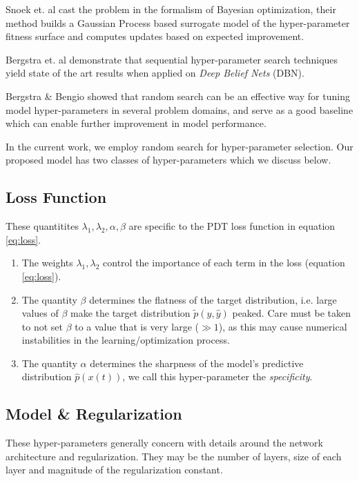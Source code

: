 \documentclass[envcountsect,runningheads]{llncs}
\theoremstyle{etoile}
\begin{document}
Snoek et. al \cite{snoek2012practical} cast the problem in the formalism of Bayesian optimization, their method 
builds a Gaussian Process based surrogate model of the hyper-parameter fitness surface and computes 
updates based on expected improvement. 


Bergstra et. al \cite{hypBengio} demonstrate that sequential hyper-parameter search techniques yield state of the art 
results when applied on \emph{Deep Belief Nets} (DBN). 

Bergstra \& Bengio \cite{randomsearchBengio} showed that random search can be an effective way for tuning model 
hyper-parameters in several problem domains, and serve as a good baseline which can enable 
further improvement in model performance.

In the current work, we employ random search for hyper-parameter selection. 
Our proposed model has two classes of hyper-parameters which we discuss below.

\subsection{Loss Function}

These quantitites $\lambda_1, \lambda_2, \alpha, \beta$ are specific to the PDT loss function in equation 
\ref{eq:loss}. 

\begin{enumerate}
\item The weights $\lambda_1, \lambda_2$ control the importance of each term in the loss (equation \ref{eq:loss}).
\item The quantity $\beta$ determines the flatness of the target distribution, i.e. large values of $\beta$ 
      make the target distribution $\tilde{p}(y, \hat{y})$ peaked. Care must be taken to not set $\beta$ to a value
      that is very large ($\gg 1$), as this may cause numerical instabilities in the learning/optimization process.
\item The quantity $\alpha$ determines the sharpness of the model's predictive distribution $\hat{p}(x(t))$, 
      we call this hyper-parameter the \emph{specificity}.        
\end{enumerate}
 

\subsection{Model \& Regularization}

These hyper-parameters generally concern with details around the network architecture and 
regularization. They may be the number of layers, size of each layer and magnitude of the 
regularization constant.
\end{document}
